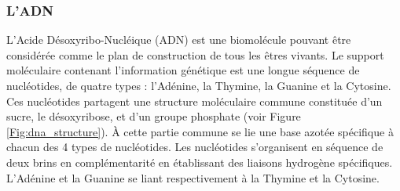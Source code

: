\subsubsection{L'ADN}

L'Acide Désoxyribo-Nucléique (ADN) est une biomolécule pouvant être considérée comme le plan de construction de tous les êtres vivants. Le support moléculaire contenant l'information génétique est une longue séquence de nucléotides, de quatre types : l'Adénine, la Thymine, la Guanine et la Cytosine. Ces nucléotides partagent une structure moléculaire commune constituée d'un sucre, le désoxyribose, et d'un groupe phosphate (voir Figure \ref{Fig:dna_structure}). À cette partie commune se lie une base azotée spécifique à chacun des 4 types de nucléotides. Les nucléotides s'organisent en séquence de deux brins en complémentarité en établissant des liaisons hydrogène spécifiques. L'Adénine et la Guanine se liant respectivement à la Thymine et la Cytosine.

